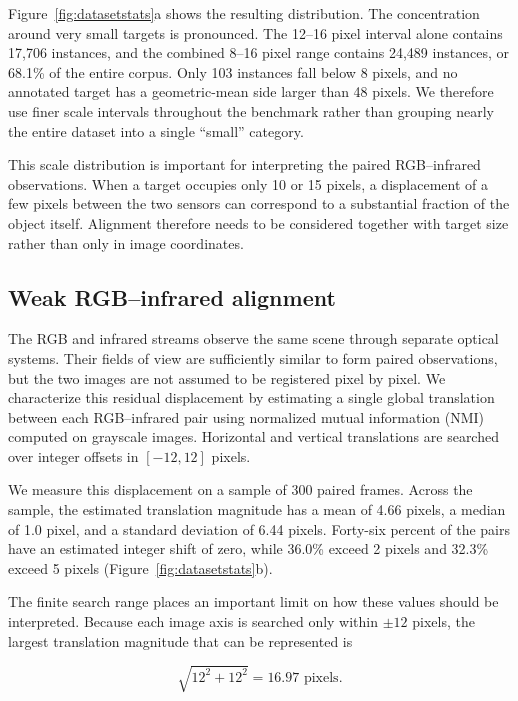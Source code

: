 \documentclass[10pt]{article}
\begin{document}
Figure~\ref{fig:datasetstats}a shows the resulting distribution. The concentration around very small targets is pronounced. The 12--16 pixel interval alone contains 17,706 instances, and the combined 8--16 pixel range contains 24,489 instances, or 68.1\% of the entire corpus. Only 103 instances fall below 8 pixels, and no annotated target has a geometric-mean side larger than 48 pixels. We therefore use finer scale intervals throughout the benchmark rather than grouping nearly the entire dataset into a single ``small'' category.

This scale distribution is important for interpreting the paired RGB--infrared observations. When a target occupies only 10 or 15 pixels, a displacement of a few pixels between the two sensors can correspond to a substantial fraction of the object itself. Alignment therefore needs to be considered together with target size rather than only in image coordinates.

\subsection{Weak RGB--infrared alignment}
\label{sec:alignment}

The RGB and infrared streams observe the same scene through separate optical systems. Their fields of view are sufficiently similar to form paired observations, but the two images are not assumed to be registered pixel by pixel. We characterize this residual displacement by estimating a single global translation between each RGB--infrared pair using normalized mutual information (NMI) computed on grayscale images. Horizontal and vertical translations are searched over integer offsets in $[-12,12]$ pixels.

We measure this displacement on a sample of 300 paired frames. Across the sample, the estimated translation magnitude has a mean of 4.66 pixels, a median of 1.0 pixel, and a standard deviation of 6.44 pixels. Forty-six percent of the pairs have an estimated integer shift of zero, while 36.0\% exceed 2 pixels and 32.3\% exceed 5 pixels (Figure~\ref{fig:datasetstats}b).

The finite search range places an important limit on how these values should be interpreted. Because each image axis is searched only within $\pm12$ pixels, the largest translation magnitude that can be represented is

\begin{equation}
\sqrt{12^2+12^2}=16.97 \text{ pixels}.
\end{equation}
\end{document}
